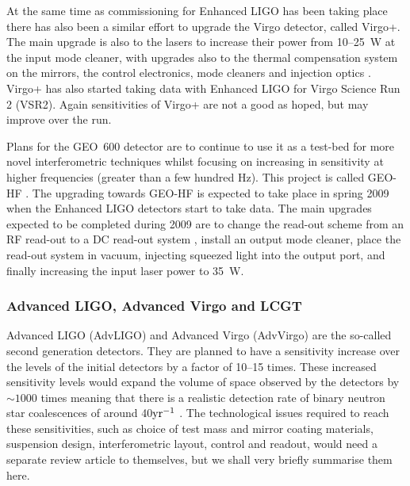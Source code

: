 \documentclass{article}
\begin{document}
At the same time as commissioning for Enhanced LIGO has been taking place there
has also been a similar effort to upgrade the Virgo detector, called Virgo+.
The main upgrade is also to the lasers to increase their power from 10--25~W at
the input mode cleaner, with upgrades also to the thermal compensation system 
on the mirrors, the control electronics, mode cleaners and injection optics
\cite{Acernese:2008b, AdVwhitepaper}. Virgo+ has also started taking data with 
Enhanced LIGO for Virgo Science Run 2 (VSR2). Again sensitivities of Virgo+ are
not a good as hoped, but may improve over the run.

Plans for the GEO~600 detector are to continue to use it as a test-bed for more
novel interferometric techniques whilst focusing on increasing in sensitivity
at higher frequencies (greater than a few hundred Hz). This project is called
GEO-HF \cite{Willke:2006}. The upgrading towards GEO-HF is expected to take
place in spring 2009 when the Enhanced LIGO detectors start to take data. The
main upgrades expected to be completed during 2009 are to change the read-out
scheme from an RF read-out to a DC read-out system \cite{Hild:2008}, install an
output mode cleaner, place the read-out system in vacuum, injecting squeezed
light \cite{Vahlbruch:2008, Chelkowski:2007} into the output port, and finally
increasing the input laser power to 35~W.

\subsubsection{Advanced LIGO, Advanced Virgo and LCGT}
Advanced LIGO (AdvLIGO) \cite{AdvLIGO, AdvLIGOweb} and Advanced Virgo (AdvVirgo)
\cite{AdvVirgo, AdvVirgoweb}  are the so-called second generation detectors.
They are planned to have a sensitivity increase over the levels of the initial
detectors by a factor of 10--15 times. These increased sensitivity levels would
expand the volume of space observed by the detectors by $\sim1000$ times meaning
that there is a realistic detection rate of binary neutron star coalescences of
around 40${\rm yr}^{-1}$ \cite{Kopparapu:2008}. The technological issues
required to reach these sensitivities, such as choice of test mass and mirror
coating materials, suspension design, interferometric layout, control and
readout, would need a separate review article to themselves, but we shall very
briefly summarise them here.
\end{document}
